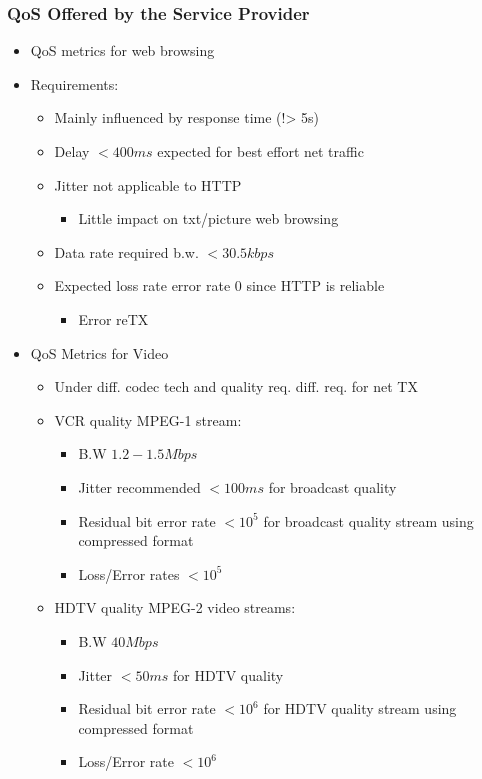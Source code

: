 \documentclass[a4paper]{article}
\begin{document}
\subsubsection{QoS Offered by the Service Provider}
\begin{itemize}
	\item QoS metrics for web browsing
	\item Requirements:
	\begin{itemize}
		\item Mainly influenced by response time (!> 5s)
		\item Delay $<400ms$ expected for best effort net traffic
		\item Jitter not applicable to HTTP
		\begin{itemize}
			\item Little impact on txt/picture web browsing
		\end{itemize}
		\item Data rate \amp required b.w. $<30.5kbps$ 
		\item Expected loss rate \amp error rate 0 since HTTP is
			reliable
		\begin{itemize}
			\item Error reTX
		\end{itemize}
	\end{itemize}
	\item QoS Metrics for Video
	\begin{itemize}
		\item Under diff. codec tech and quality req. diff. req. for net
			TX
		\item VCR quality MPEG-1 stream:
		\begin{itemize}
			\item B.W $1.2-1.5Mbps$ 
			\item Jitter recommended $<100ms$ for broadcast quality
			\item Residual bit error rate $<10^5$ for broadcast
				quality stream using compressed format
			\item Loss/Error rates $<10^5$
		\end{itemize}
		\item HDTV quality MPEG-2 video streams:
		\begin{itemize}
			\item B.W $40Mbps$ 
			\item Jitter $<50ms$ for HDTV quality
			\item Residual bit error rate $<10^6$ for HDTV quality
				stream using compressed format
			\item Loss/Error rate $<10^6$

\end{itemize}
\end{itemize}
\end{itemize}
\end{document}
